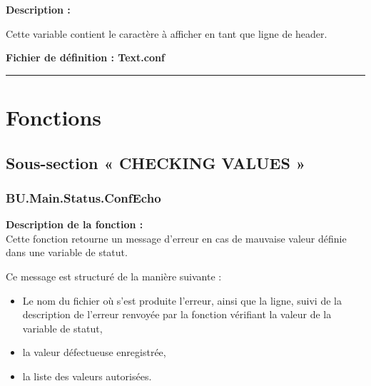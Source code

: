 \documentclass[a4paper,10pt]{article}
\begin{document}
\textbf{Description :}

\begin{justify}
    Cette variable contient le caractère à afficher en tant que ligne de header.
\end{justify}

\textbf{Fichier de définition : \color{lime}Text.conf}\\[1\baselineskip]





\color{sec1}\par\noindent\rule{\textwidth}{0.4pt}\color{text}

\color{sec1}
\section{Fonctions}\color{text}

\color{sec2}
\subsection{Sous-section « CHECKING VALUES »}

\color{sec3}
\subsubsection{BU.Main.Status.ConfEcho}\color{text}

\begin{justify}
\textbf{Description de la fonction :}\\[1\baselineskip]
    Cette fonction retourne un message d'erreur en cas de mauvaise valeur définie dans une variable de statut.
\end{justify}

\begin{justify}
   	Ce message est structuré de la manière suivante :

   	\begin{itemize}
   		\item Le nom du fichier où s'est produite l'erreur, ainsi que la ligne, suivi de la description de l'erreur renvoyée par la fonction vérifiant la valeur de la variable de statut,\setlength{\parskip}{1em}

   		\item la valeur défectueuse enregistrée,

   		\item la liste des valeurs autorisées.
   	\end{itemize}
\end{justify}
\end{document}

